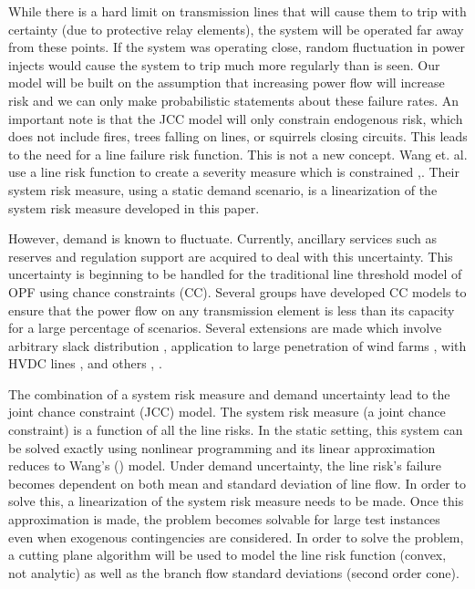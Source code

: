 While there is a hard limit on transmission lines that will cause them to trip with certainty (due to protective relay elements), the system will be operated far away from these points.  If the system was operating close, random fluctuation in power injects would cause the system to trip much more regularly than is seen.  Our model will be built on the assumption that increasing power flow will increase risk and we can only make probabilistic statements about these failure rates. An important note is that the JCC model will only constrain endogenous risk, which does not include fires, trees falling on lines, or squirrels closing circuits.  This leads to the need for a line failure risk function.  This is not a new concept.  Wang et. al. use a line risk function to create a severity measure which is constrained \cite{wang_2013},\cite{wang_2014}.  Their system risk measure, using a static demand scenario, is a linearization of the system risk measure developed in this paper. 

However, demand is known to fluctuate.  Currently, ancillary services such as reserves and regulation support are acquired to deal with this uncertainty.  This uncertainty is beginning to be handled for the traditional line threshold model of OPF using chance constraints (CC).  Several groups have developed CC models to ensure that the power flow on any transmission element is less than its capacity for a large percentage of scenarios.  Several extensions are made which involve arbitrary slack distribution \cite{bienstock_2012}, application to large penetration of wind farms \cite{vrakopoulou_2013b}, with HVDC lines \cite{vrakopoulou_2013}, and others \cite{roald_2013}, \cite{vrakopoulou_2013c}.

The combination of a system risk measure and demand uncertainty lead to the joint chance constraint (JCC) model.  The system risk measure (a joint chance constraint) is a function of all the line risks.  In the static setting, this  system can be solved exactly using nonlinear programming and its linear approximation reduces to Wang's (\cite{wang_2013}) model.  Under demand uncertainty, the line risk's failure becomes dependent on both mean and standard deviation of line flow. In order to solve this, a linearization of the system risk measure needs to be made.  Once this approximation is made, the problem becomes solvable for large test instances even when exogenous contingencies are considered.  In order to solve the problem, a cutting plane algorithm will be used to model the line risk function (convex, not analytic) as well as the branch flow standard deviations (second order cone).

